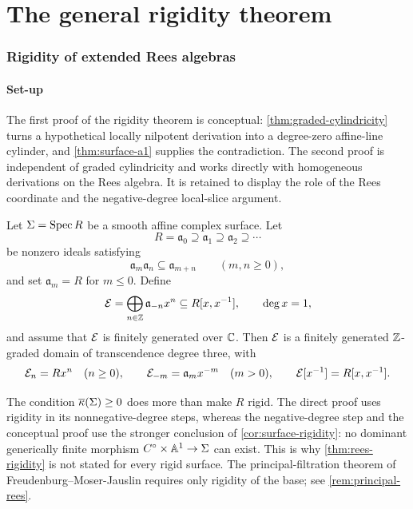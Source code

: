 \part{The general rigidity theorem}\label{part:rigidity}
\section{Rigidity of extended Rees algebras}\label{sec:rees-rigidity}

\subsection{Set-up}

\begin{roadmap}\label{roadmap:two-rigidity-proofs}
The first proof of the rigidity theorem is conceptual: \cref{thm:graded-cylindricity} turns a hypothetical locally nilpotent derivation into a degree-zero affine-line cylinder, and \cref{thm:surface-a1} supplies the contradiction.  The second proof is independent of graded cylindricity and works directly with homogeneous derivations on the Rees algebra.  It is retained to display the role of the Rees coordinate and the negative-degree local-slice argument.
\end{roadmap}

\begin{setup}\label{setup:general-rees}
Let $\Sigma=\operatorname{Spec} R$ be a smooth affine complex surface.  Let
\[
  R=\mathfrak a_0\supseteq\mathfrak a_1\supseteq\mathfrak a_2\supseteq\cdots
\]
be nonzero ideals satisfying
\[
  \mathfrak a_m\mathfrak a_n\subseteq\mathfrak a_{m+n}
  \qquad(m,n\geq0),
\]
and set $\mathfrak a_m=R$ for $m\leq0$.  Define
\begin{equation}\label{eq:extended-rees}
  \mathcal E=\bigoplus_{n\in\mathbb Z}\mathfrak a_{-n}x^n
  \subseteq R[x,x^{-1}],
  \qquad \deg x=1,
\end{equation}
and assume that $\mathcal E$ is finitely generated over $\mathbb C$.  Then $\mathcal E$ is a finitely generated $\mathbb Z$-graded domain of transcendence degree three, with
\begin{equation}\label{eq:rees-components}
  \mathcal E_n=Rx^n\quad(n\geq0),
  \qquad
  \mathcal E_{-m}=\mathfrak a_mx^{-m}\quad(m>0),
  \qquad
  \mathcal E[x^{-1}]=R[x,x^{-1}].
\end{equation}
\end{setup}

\begin{remark}\label{rem:surface-hypothesis-strength}
The condition $\overline\kappa(\Sigma)\geq0$ does more than make $R$ rigid.  The direct proof uses rigidity in its nonnegative-degree steps, whereas the negative-degree step and the conceptual proof use the stronger conclusion of \cref{cor:surface-rigidity}: no dominant generically finite morphism $C^{\circ}\times\mathbb A^1\to\Sigma$ can exist.  This is why \cref{thm:rees-rigidity} is not stated for every rigid surface.  The principal-filtration theorem of Freudenburg--Moser-Jauslin requires only rigidity of the base; see \cref{rem:principal-rees}.
\end{remark}


